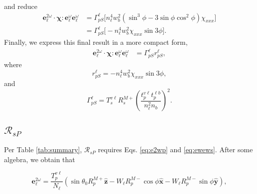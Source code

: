 \documentclass{article}
\begin{document}
and reduce
\begin{equation*}
\begin{split}
\mathbf{e}^{2\omega}_{\ell}\cdot\boldsymbol{\chi}:
\mathbf{e}^{\omega}_{\ell}\mathbf{e}^{\omega}_{\ell} &=
\Gamma^{\ell}_{pS}
\big[
n^{4}_{\ell}w^{2}_{b}(\sin^{3}\phi - 3\sin\phi\cos^{2}\phi)\chi_{xxx}
\big]\\
&=
\Gamma^{\ell}_{pS}
\big[
-n^{4}_{\ell}w^{2}_{b}\chi_{xxx}\sin3\phi
\big].
\end{split}
\end{equation*}
Finally, we express this final result in a more compact form,
\begin{equation}
\begin{split}
\mathbf{e}^{2\omega}_{\ell}\cdot\boldsymbol{\chi}:
\mathbf{e}^{\omega}_{\ell}\mathbf{e}^{\omega}_{\ell} &=
\Gamma^{\ell}_{pS}
r^{\ell}_{pS},
\end{split}
\end{equation}
where
\begin{equation}
r^{\ell}_{pS} = -n^{4}_{\ell}w^{2}_{b}\chi_{xxx}\sin3\phi,
\end{equation}
and
\begin{equation}
\Gamma^{\ell}_{pS} = T_{s}^{v\ell}R^{M+}_{s}
\left(\frac{t^{v\ell}_{p}t^{\ell b}_{p}}{n^{2}_{\ell}n_{b}}\right)^{2}.
\end{equation}


\subsection{\texorpdfstring{$\mathcal{R}_{sP}$}{RsP}}\label{sec:RsP}

Per Table \ref{tab:summary}, $\mathcal{R}_{sP}$ requires Eqs. \eqref{eq:e2wp}
and \eqref{eq:ewews}. After some algebra, we obtain that


\begin{equation}
\mathbf{e}^{2\omega}_{\ell} =
\frac{T^{v\ell}_{p}}{N_{\ell}}
\left(
  \sin\theta_{0}R^{M+}_{p}\hat{\mathbf{z}}
- W_{\ell}R^{M-}_{p}\cos\phi\hat{\mathbf{x}}
- W_{\ell}R^{M-}_{p}\sin\phi\hat{\mathbf{y}}
\right),
\end{equation}
\end{document}
